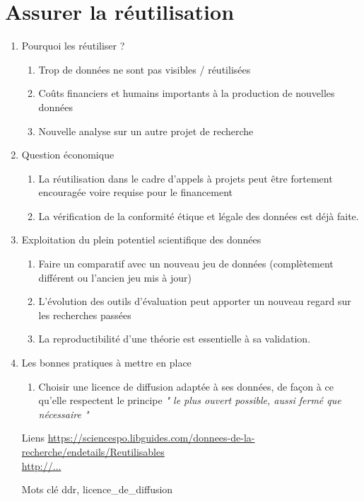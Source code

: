 \documentclass{book}
\begin{document}
\section{Assurer la réutilisation}
\begin{enumerate}
	\item Pourquoi les réutiliser ?
        \begin{enumerate}
            \item Trop de données ne sont pas visibles / réutilisées
            \item Coûts financiers et humains importants à la production de nouvelles données
	      	\item Nouvelle analyse sur un autre projet de recherche
        \end{enumerate}
	\item Question économique
        \begin{enumerate}
            \item  La réutilisation dans le cadre d'appels à projets peut être fortement encouragée voire requise pour le financement
            \item La vérification de la conformité étique et légale des données est déjà faite.
        \end{enumerate}
	\item Exploitation du plein potentiel scientifique des données
        \begin{enumerate}
            \item Faire un comparatif avec un nouveau jeu de données (complètement différent ou l'ancien jeu mis à jour)
	      	\item L'évolution des outils d'évaluation peut apporter un nouveau regard sur les recherches passées
            \item La reproductibilité d'une théorie est essentielle à sa validation. 
        \end{enumerate}
    \item Les bonnes pratiques à mettre en place
        \begin{enumerate}
            \item Choisir une licence de diffusion adaptée à ses données, de façon à ce qu'elle respectent le principe \textit{" le plus ouvert possible, aussi fermé que nécessaire "}
        \end{enumerate}
\end{enumerate}

\begin{itemize}
    \item [Liens]
        \url{https://sciencespo.libguides.com/donnees-de-la-recherche/endetails/Reutilisables}\\
        \url{http://...}\\
    \item [Mots clé]
        \Gls{ddr}, \Gls{licence_de_diffusion}
\end{itemize}
\end{document}
